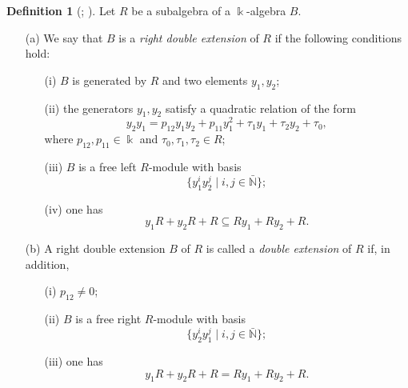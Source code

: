 \documentclass{amsart}
\theoremstyle{definition}
\newtheorem{definition}[theorem]{Definition}
\theoremstyle{remark}
\numberwithin{equation}{section}
\begin{document}
\begin{definition}[{\cite[Definition 1.3]{ZhangZhang2008}; \cite[Definition 1.1]{Carvalhoetal2011}}]\label{DefinitionDoubleExtension}
Let $R$ be a subalgebra of a $\Bbbk$-algebra $B$.
\begin{enumerate}
    \item[\rm (a)] We say that $B$ is a \emph{right double extension} of $R$ if the following conditions hold:
    \begin{itemize}
        \item[\rm (i)] $B$ is generated by $R$ and two elements $y_1,y_2$;
        \item[\rm (ii)] the generators $y_1,y_2$ satisfy a quadratic relation of the form
        \begin{equation}\label{RelationY2Y1General}
        y_2y_1
        =
        p_{12}y_1y_2+p_{11}y_1^2+\tau_1y_1+\tau_2y_2+\tau_0,
        \end{equation}
        where $p_{12},p_{11}\in\Bbbk$ and $\tau_0,\tau_1,\tau_2\in R$;
        \item[\rm (iii)] $B$ is a free left $R$-module with basis
        \[
        \{y_1^iy_2^j\mid i,j\in\bar{\mathbb{N}}\};
        \]
        \item[\rm (iv)] one has
        \[
        y_1R+y_2R+R\subseteq Ry_1+Ry_2+R.
        \]
    \end{itemize}

    \item[\rm (b)] A right double extension $B$ of $R$ is called a \emph{double extension} of $R$ if, in addition,
    \begin{itemize}
        \item[\rm (i)] $p_{12}\neq 0$;
        \item[\rm (ii)] $B$ is a free right $R$-module with basis
        \[
        \{y_2^iy_1^j\mid i,j\in\bar{\mathbb{N}}\};
        \]
        \item[\rm (iii)] one has
        \[
        y_1R+y_2R+R=Ry_1+Ry_2+R.
        \]
    \end{itemize}
\end{enumerate}
\end{definition}
\end{document}
